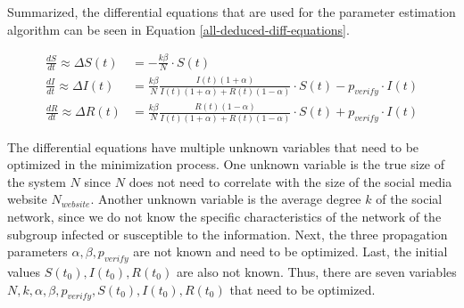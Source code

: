 Summarized, the differential equations that are used for the parameter estimation 
algorithm can be seen in Equation \ref{all-deduced-diff-equations}.

\begin{subequations}
    \begin{align}
        \frac{dS}{dt} \approx \Delta S(t) &= -\frac{k\beta}{N} \cdot S(t) \\
        \frac{dI}{dt} \approx \Delta I(t) &=  \frac{k\beta}{N} \frac{I(t)(1+\alpha)}{I(t)(1+\alpha)+R(t)(1-\alpha)}
        \cdot S(t) - p_{verify}\cdot I(t) \\
        \frac{dR}{dt} \approx \Delta R(t) &= \frac{k\beta}{N} \frac{R(t)(1-\alpha)}{I(t)(1+\alpha)+R(t)(1-\alpha)} 
        \cdot S(t) + p_{verify}\cdot I(t)
\end{align}
\label{all-deduced-diff-equations}
\end{subequations}


The differential equations have multiple unknown variables that need
to be optimized in the minimization process. One unknown variable is
the true size of the system $N$ since $N$ does not need to correlate 
with the size of the social media website $N_{website}$.
Another unknown variable is the average degree $k$ of the social network,
since we do not know the specific characteristics of the network of the
subgroup infected or susceptible to the information.
Next, the three propagation parameters $\alpha, \beta, p_{verify}$ are not known
and need to be optimized. 
Last, the initial values $S(t_0), I(t_0), R(t_0)$ are also not known.
Thus, there are seven variables $N, k, \alpha, \beta, p_{verify}, 
S(t_0), I(t_0), R(t_0)$
that need to be optimized.



